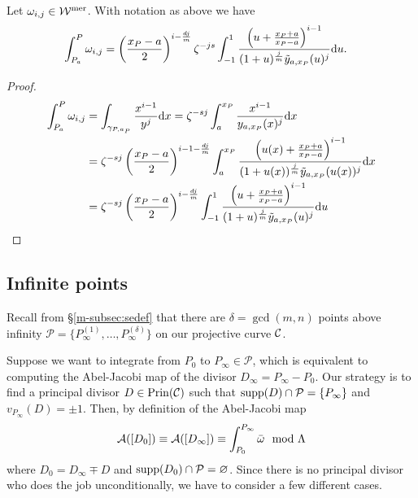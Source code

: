 \documentclass[main.tex]{subfiles}
\begin{document}
  \begin{thm}\label{thm:ajm_finite_int}
  Let $\omega_{i,j} \in \mathcal{W}^{\text{mer}}$. With notation as above we have
 \begin{align}\label{eq:aj_int}
  \begin{split}
       \int_{P_a}^P \omega_{i,j} & = \left(\frac{x_P-a}{2}\right)^{i-\frac{dj}{m}} \zeta^{-js} \int_{-1}^1
      \frac{\left(u + \frac{x_P+a}{x_P-a}\right)^{i-1}}{(1+u)^{\frac{j}{m}} \tilde{y}_{a,x_P}(u)^j}  \mathrm d u.
   \end{split}
   \end{align}
  \end{thm}
  \begin{proof}
    \begin{align}
    \begin{split}
     \int_{P_a}^P \omega_{i,j}  & =  \int_{\gamma_{P,a_P}} \frac{x^{i-1}}{y^j}  \mathrm d x  =  \zeta^{-sj} \int_a^{x_P} \frac{x^{i-1}}{y_{a,x_P}(x)^j}  \mathrm d x \\  & = 
     \zeta^{-sj} \left(\frac{x_P-a}{2}\right)^{i-1-\frac{dj}{m}}
     \int_a^{x_P} \frac{\left(u(x)+\frac{x_P+a}{x_P-a}\right)^{i-1}}{(1+u(x))^{\frac{j}{m}}\tilde{y}_{a,x_P}(u(x))^j}  \mathrm d x \\
     & =  \zeta^{-sj} \left(\frac{x_P-a}{2}\right)^{i-\frac{dj}{m}}
     \int_{-1}^{1} \frac{\left(u+\frac{x_P+a}{x_P-a}\right)^{i-1}}{(1+u)^{\frac{j}{m}}\tilde{y}_{a,x_P}(u)^j}  \mathrm d u \\
    \end{split}
  \end{align}
  \end{proof}

  \subsection{Infinite points}\label{subsec:ajm_infty}

  Recall from \S \ref{m-subsec:sedef} that there are $\delta = \gcd(m,n)$ points above infinity $\mathcal{P}
  = \{ P_{\infty}^{(1)},\dots, P_{\infty}^{(\delta)} \}$ on our projective curve $\mathcal{C}$.
  
  Suppose we want to integrate from $P_0$ to $P_{\infty} \in \mathcal{P}$, which is equivalent to computing the Abel-Jacobi map of the divisor
  $D_{\infty} = P_{\infty} - P_0$.
  Our strategy is to find a principal divisor $D \in \operatorname{Prin}(\mathcal{C})$ such that $\operatorname{supp}(D) \cap \mathcal{P} = \{ P_{\infty} \}$
  and $v_{P_{\infty}}(D) = \pm 1$. Then, by definition of the Abel-Jacobi map
  \begin{equation}
  \mathcal{A}([D_0]) \equiv \mathcal{A}([D_{\infty}]) \equiv \int_{P_0}^{P_{\infty}} \bar{\omega} \mod \Lambda
  \end{equation}
  where $D_0 = D_{\infty} \mp D$ and $\operatorname{supp}(D_0) \cap \mathcal{P} = \varnothing$.
  Since there is no principal divisor who does the job unconditionally, we have to consider a few different cases.
  
\end{document}
